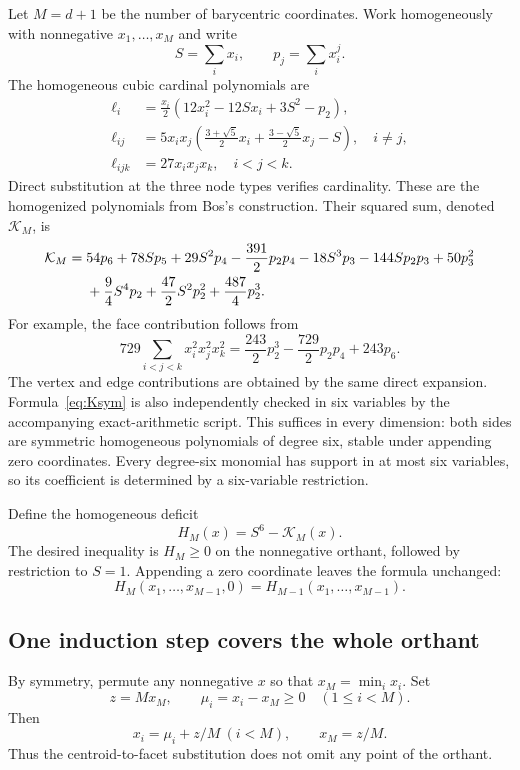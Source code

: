 \documentclass[11pt,a4paper]{article}
\theoremstyle{remark}
\begin{document}
Let $M=d+1$ be the number of barycentric coordinates. Work homogeneously with nonnegative $x_1,\ldots,x_M$ and write
\[
 S=\sum_i x_i,\qquad p_j=\sum_i x_i^j.
\]
The homogeneous cubic cardinal polynomials are
\begin{align}
 \ell_i&=\frac{x_i}{2}(12x_i^2-12Sx_i+3S^2-p_2),\label{eq:cubicvertex}\\
 \ell_{ij}&=5x_ix_j\left(\frac{3+\sqrt5}{2}x_i+
                 \frac{3-\sqrt5}{2}x_j-S\right),\quad i\ne j,
                 \label{eq:cubicedge}\\
 \ell_{ijk}&=27x_ix_jx_k,\quad i<j<k.\label{eq:cubicface}
\end{align}
Direct substitution at the three node types verifies cardinality. These are the homogenized polynomials from Bos's construction. Their squared sum, denoted $\mathcal K_M$, is
\begin{align}\label{eq:Ksym}
 \mathcal K_M={}&54p_6+78Sp_5+29S^2p_4-\frac{391}{2}p_2p_4
 -18S^3p_3-144Sp_2p_3+50p_3^2\notag\\
 &+\frac94S^4p_2+\frac{47}{2}S^2p_2^2+\frac{487}{4}p_2^3.
\end{align}
For example, the face contribution follows from
\[
 729\sum_{i<j<k}x_i^2x_j^2x_k^2
 =\frac{243}{2}p_2^3-\frac{729}{2}p_2p_4+243p_6.
\]
The vertex and edge contributions are obtained by the same direct expansion. Formula~\eqref{eq:Ksym} is also independently checked in six variables by the accompanying exact-arithmetic script. This suffices in every dimension: both sides are symmetric homogeneous polynomials of degree six, stable under appending zero coordinates. Every degree-six monomial has support in at most six variables, so its coefficient is determined by a six-variable restriction.

Define the homogeneous deficit
\[
 H_M(x)=S^6-\mathcal K_M(x).
\]
The desired inequality is $H_M\ge0$ on the nonnegative orthant, followed by restriction to $S=1$. Appending a zero coordinate leaves the formula unchanged:
\[
 H_M(x_1,\ldots,x_{M-1},0)=H_{M-1}(x_1,\ldots,x_{M-1}).
\]

\subsection{One induction step covers the whole orthant}

By symmetry, permute any nonnegative $x$ so that $x_M=\min_i x_i$. Set
\[
 z=Mx_M,\qquad \mu_i=x_i-x_M\ge0\quad(1\le i<M).
\]
Then
\begin{equation}\label{eq:centroidsub}
 x_i=\mu_i+z/M\ (i<M),\qquad x_M=z/M.
\end{equation}
Thus the centroid-to-facet substitution does not omit any point of the orthant.
\end{document}
